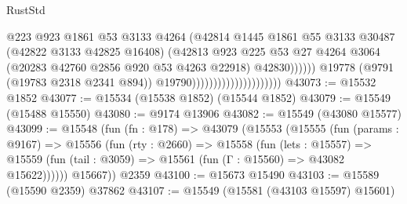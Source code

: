 \begin{lexlean}{RustStd}
\begin{coremodule}
                                                      @223
                                                      @923
                                                      @1861
                                                      @53
                                                      @3133
                                                      @4264
                                                      (@42814
                                                        @1445
                                                        @1861
                                                        @55
                                                        @3133
                                                        @30487
                                                        (@42822 @3133 @42825 @16408)
                                                        (@42813
                                                          @923
                                                          @225
                                                          @53
                                                          @27
                                                          @4264
                                                          @3064
                                                          (@20283
                                                            @42760
                                                            @2856
                                                            @920
                                                            @53
                                                            @4263
                                                            @22918)
                                                          @42830))))))
                                              @19778
                                              (@9791 (@19783 @2318 @2341 @894))
                                              @19790)))))))))))))))))))))
@43073 := @15532 @1852
@43077 := @15534 (@15538 @1852) (@15544 @1852)
@43079 := @15549 (@15488 @15550)
@43080 := @9174 @13906
@43082 := @15549 (@43080 @15577)
@43099 := @15548
    (fun (fn : @178) =>
    @43079
      (@15553
        (@15555
          (fun (params : @9167) =>
          @15556
            (fun (rty : @2660) =>
            @15558
              (fun (lets : @15557) =>
              @15559 (fun (tail : @3059) => @15561 (fun (Γ : @15560) => @43082 @15622))))))
        @15667))
    @2359
@43100 := @15673 @15490
@43103 := @15589 (@15590 @2359) @37862
@43107 := @15549 (@15581 (@43103 @15597) @15601)

\end{coremodule}
\end{lexlean}
